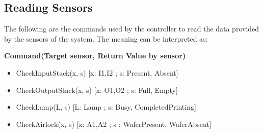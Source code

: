\documentclass[a4paper,12pt]{article}
\begin{document}
\subsection {Reading Sensors}
The following are the commands used by the controller to read the data provided by the sensors of the system. The meaning can be interpreted as: \bigskip

\textbf{Command(Target sensor, Return Value by sensor)}
\begin{itemize}
\item CheckInputStack(x, s)              [x: I1,I2 ; s: Present, Absent] 
\item CheckOutputStack(x, s)          [x: O1,O2 ; s: Full, Empty]
\item CheckLamp(L, s)	                  [L: Lamp ; s: Busy, CompletedPrinting]	
\item CheckAirlock(x, s)                    [x: A1,A2 ; s : WaferPresent, WaferAbsent]  %
\end{itemize}
\newpage
\end{document}
